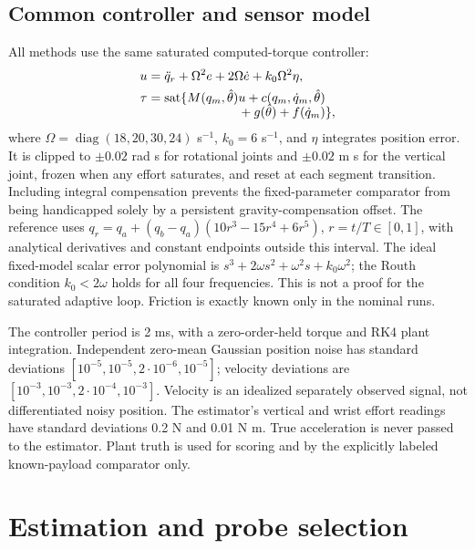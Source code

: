 \documentclass[10pt,twocolumn]{article}
\begin{document}
\subsection{Common controller and sensor model}
All methods use the same saturated computed-torque controller:
\begin{align}
 u&=\ddot q_r+\Omega^2e+2\Omega\dot e+k_0\Omega^2\eta,\\
 \tau&=\operatorname{sat}\{M(q_m,\hat\theta)u+c(q_m,\dot q_m,\hat\theta)
 \nonumber\\[-2mm]
 &\hspace{25mm}+g(\hat\theta)+f(\dot q_m)\},
\end{align}
where $\Omega=\operatorname{diag}(18,20,30,24)$ s$^{-1}$, $k_0=6$ s$^{-1}$, and $\eta$ integrates position error. It is clipped to $\pm0.02$ rad s for rotational joints and $\pm0.02$ m s for the vertical joint, frozen when any effort saturates, and reset at each segment transition. Including integral compensation prevents the fixed-parameter comparator from being handicapped solely by a persistent gravity-compensation offset. The reference uses $q_r=q_a+(q_b-q_a)(10r^3-15r^4+6r^5)$, $r=t/T\in[0,1]$, with analytical derivatives and constant endpoints outside this interval. The ideal fixed-model scalar error polynomial is $s^3+2\omega s^2+\omega^2s+k_0\omega^2$; the Routh condition $k_0<2\omega$ holds for all four frequencies. This is not a proof for the saturated adaptive loop. Friction is exactly known only in the nominal runs.

The controller period is 2 ms, with a zero-order-held torque and RK4 plant integration. Independent zero-mean Gaussian position noise has standard deviations $[10^{-5},10^{-5},2\cdot10^{-6},10^{-5}]$; velocity deviations are $[10^{-3},10^{-3},2\cdot10^{-4},10^{-3}]$. Velocity is an idealized separately observed signal, not differentiated noisy position. The estimator's vertical and wrist effort readings have standard deviations 0.2 N and 0.01 N m. True acceleration is never passed to the estimator. Plant truth is used for scoring and by the explicitly labeled known-payload comparator only.

\section{Estimation and probe selection}
\end{document}
